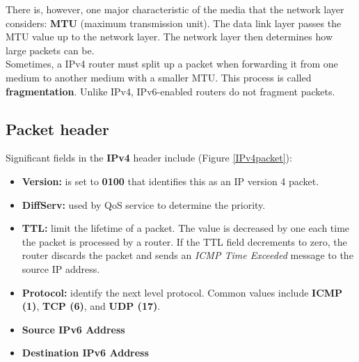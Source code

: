 {There is, however, one major characteristic of the media that the network layer considers: \textbf{MTU} (maximum transmission unit). The data link layer passes the MTU value up to the network layer. The network layer then determines how large packets can be.\\

Sometimes, a IPv4 router must split up a packet when forwarding it from one medium to another medium with a smaller MTU. This process is called \textbf{fragmentation}. Unlike IPv4, IPv6-enabled routers do not fragment packets.

\subsection{Packet header}

Significant fields in the \textbf{IPv4} header include (Figure \ref{IPv4packet}):

\begin{itemize}
\item \textbf{Version:} is set to \textbf{0100} that identifies this as an IP version 4 packet.

\item \textbf{DiffServ:} used by QoS service to determine the priority.

\item \textbf{TTL:} limit the lifetime of a packet. The value is decreased by one each time the packet is processed by a router. If the TTL field decrements to zero, the router discards the packet and sends an \emph{ICMP Time Exceeded} message to the source IP address.

\item \textbf{Protocol:} identify the next level protocol. Common values include \textbf{ICMP (1)}, \textbf{TCP (6)}, and \textbf{UDP (17)}.

\item \textbf{Source IPv6 Address}

\item \textbf{Destination IPv6 Address}
\end{itemize}

}
